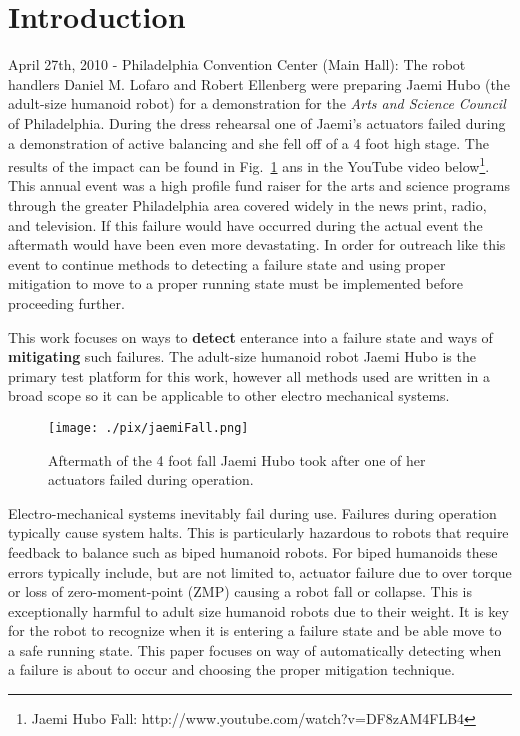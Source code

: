\section{Introduction}

April 27th, 2010 - Philadelphia Convention Center (Main Hall):  The robot handlers Daniel M. Lofaro and Robert Ellenberg were preparing Jaemi Hubo (the adult-size humanoid robot) for a demonstration for the \textit{Arts and Science Council} of Philadelphia.  During the dress rehearsal one of Jaemi's actuators failed during a demonstration of active balancing and she fell off of a 4 foot high stage.  The results of the impact can be found in Fig.~\ref{fig:fall} ans in the YouTube video below\footnote{Jaemi Hubo Fall: http://www.youtube.com/watch?v=DF8zAM4FLB4}.  This annual event was a high profile fund raiser for the arts and science programs through the greater Philadelphia area covered widely in the news print, radio, and television.  If this failure would have occurred during the actual event the aftermath would have been even more devastating.  In order for outreach like this event to continue methods to detecting a failure state and using proper mitigation to move to a proper running state must be implemented before proceeding further.  

This work focuses on ways to \textbf{detect} enterance into a failure state and ways of \textbf{mitigating} such failures.  The adult-size humanoid robot Jaemi Hubo is the primary test platform for this work, however all methods used are written in a broad scope so it can be applicable to other electro mechanical systems.


\begin{figure}[thpb]
  \centering
\texttt{[image: ./pix/jaemiFall.png]}
  \caption{Aftermath of the 4 foot fall Jaemi Hubo took after one of her actuators failed during operation.}
  \label{fig:fall}
\end{figure}  


Electro-mechanical systems inevitably fail during use.  Failures during operation typically cause system halts.  This is particularly hazardous to robots that require feedback to balance such as biped humanoid robots.  For biped humanoids these errors typically include, but are not limited to, actuator failure due to over torque or loss of zero-moment-point (ZMP) \cite{zmp35} causing a robot fall or collapse.  This is exceptionally harmful to adult size humanoid robots due to their weight.  It is key for the robot to recognize when it is entering a failure state and be able move to a safe running state.  This paper focuses on way of automatically detecting when a failure is about to occur and choosing the proper mitigation technique. 

